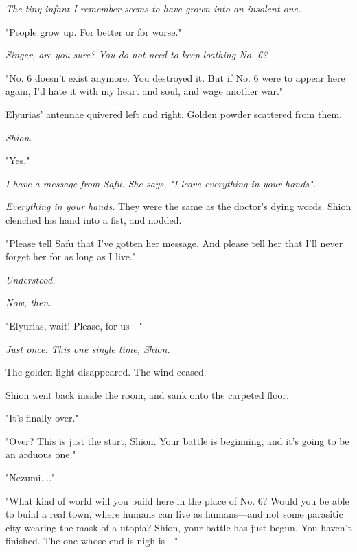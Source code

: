 \myspace

\emph{The tiny infant I remember seems to have grown into an insolent one.}

\myspace

"People grow up. For better or for worse."

\myspace

\emph{Singer, are you sure? You do not need to keep loathing No. 6?}

\myspace

"No. 6 doesn't exist anymore. You destroyed it. But if No. 6 were to
appear here again, I'd hate it with my heart and soul, and wage another
war."

Elyurias' antennae quivered left and right. Golden powder scattered from
them.

\myspace

\emph{Shion.}

\myspace

"Yes."

\myspace

\emph{I have a message from Safu. She says, "I leave everything in your
hands".}

\myspace

\emph{Everything in your hands.} They were the same as the doctor's dying
words. Shion clenched his hand into a fist, and nodded.

"Please tell Safu that I've gotten her message. And please tell her that
I'll never forget her for as long as I live."

\myspace

\emph{Understood.}

\emph{Now, then.}

\myspace

"Elyurias, wait! Please, for us---"

\myspace

\emph{Just once. This one single time, Shion.}

\myspace

The golden light disappeared. The wind ceased.

\myspace

Shion went back inside the room, and sank onto the carpeted floor.

"It's finally over."

"Over? This is just the start, Shion. Your battle is beginning, and it's
going to be an arduous one."

"Nezumi...."

"What kind of world will you build here in the place of No. 6? Would you
be able to build a real town, where humans can live as humans---and not
some parasitic city wearing the mask of a utopia? Shion, your battle has
just begun. You haven't finished. The one whose end is nigh is---"

